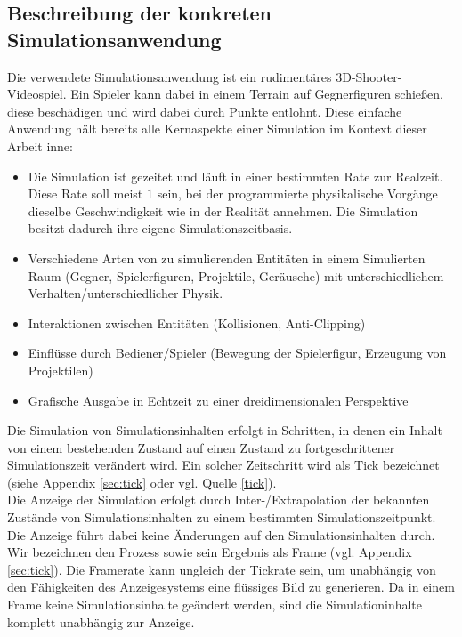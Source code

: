 \subsection{Beschreibung der konkreten Simulationsanwendung}
Die verwendete Simulationsanwendung ist ein rudimentäres 3D-Shooter-Videospiel. Ein Spieler kann dabei in einem Terrain auf Gegnerfiguren schießen, diese beschädigen und wird dabei durch Punkte entlohnt. Diese einfache Anwendung hält bereits alle Kernaspekte einer Simulation im Kontext dieser Arbeit inne:
\begin{itemize}
\item Die Simulation ist gezeitet und läuft in einer bestimmten Rate zur Realzeit. Diese Rate soll meist $1$ sein, bei der programmierte physikalische Vorgänge dieselbe Geschwindigkeit wie in der Realität annehmen. Die Simulation besitzt dadurch ihre eigene Simulationszeitbasis.
\item Verschiedene Arten von zu simulierenden Entitäten in einem Simulierten Raum (Gegner, Spielerfiguren, Projektile, Geräusche) mit unterschiedlichem Verhalten/unterschiedlicher Physik.
\item Interaktionen zwischen Entitäten (Kollisionen, Anti-Clipping)
\item Einflüsse durch Bediener/Spieler (Bewegung der Spielerfigur, Erzeugung von Projektilen)
\item Grafische Ausgabe in Echtzeit zu einer dreidimensionalen Perspektive
\end{itemize}

Die Simulation von Simulationsinhalten erfolgt in Schritten, in denen ein Inhalt von einem bestehenden Zustand auf einen Zustand zu fortgeschrittener Simulationszeit verändert wird. Ein solcher Zeitschritt wird als Tick bezeichnet (siehe Appendix \ref{sec:tick} oder vgl. Quelle \ref{tick}).\\
Die Anzeige der Simulation erfolgt durch Inter-/Extrapolation der bekannten Zustände von Simulationsinhalten zu einem bestimmten Simulationszeitpunkt. Die Anzeige führt dabei keine Änderungen auf den Simulationsinhalten durch. Wir bezeichnen den Prozess sowie sein Ergebnis als Frame (vgl. Appendix \ref{sec:tick}).
Die Framerate kann ungleich der Tickrate sein, um unabhängig von den Fähigkeiten des Anzeigesystems eine flüssiges Bild zu generieren. Da in einem Frame keine Simulationsinhalte geändert werden, sind die Simulationinhalte komplett unabhängig zur Anzeige.\\

